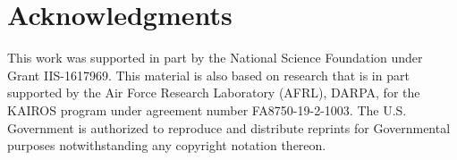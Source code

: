 \documentclass[11pt,a4paper]{article}
\begin{document}
 \section*{Acknowledgments}
This work was supported in part by the National Science Foundation under Grant IIS-1617969. This material is also based on research that is in part supported by the Air Force Research Laboratory (AFRL), DARPA, for the KAIROS program under agreement number FA8750-19-2-1003. The U.S. Government is authorized to reproduce and distribute reprints for Governmental purposes notwithstanding any copyright notation thereon. 



\end{document}
